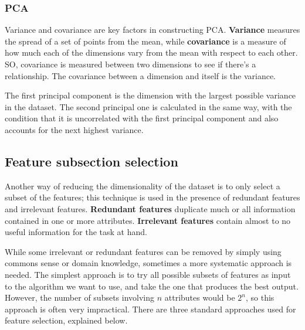 \subsubsection{PCA}
Variance and covariance are key factors in constructing PCA. \textbf{Variance} measures the spread of a set of points from the mean, while \textbf{covariance} is a measure of how much each of the dimensions vary from the mean with respect to each other. SO, covariance is measured between two dimensions to see if there's a relationship. The covariance between a dimension and itself is the variance.

The first principal component is the dimension with the largest possible variance in the dataset. The second principal one is calculated in the same way, with the condition that it is uncorrelated with the first principal component and also accounts for the next highest variance.

\subsection{Feature subsection selection}

Another way of reducing the dimensionality of the dataset is to only select a subset of the features; this technique is used in the presence of redundant features and irrelevant features. \textbf{Redundant features} duplicate much or all information contained in one or more attributes. \textbf{Irrelevant features} contain almost to no useful information for the task at hand.

While some irrelevant or redundant features can be removed by simply using commons sense or domain knowledge, sometimes a more systematic approach is needed. The simplest approach is to try all possible subsets of features as input to the algorithm we want to use, and take the one that produces the best output. However, the number of subsets involving $n$ attributes would be $2^n$, so this approach is often very impractical. There are three standard approaches used for feature selection, explained below.

